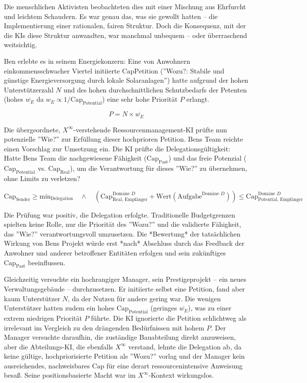 \documentclass[12pt, ngerman, parskip=full]{scrartcl} %
\begin{document}
Die menschlichen Aktivisten beobachteten dies mit einer Mischung aus Ehrfurcht und leichtem Schaudern. Es war genau das, was sie gewollt hatten – die Implementierung einer rationalen, fairen Struktur. Doch die Konsequenz, mit der die KIs diese Struktur anwandten, war manchmal unbequem – oder überraschend weitsichtig.

Ben erlebte es in seinem Energiekonzern: Eine von Anwohnern einkommensschwacher Viertel initiierte $\text{CapPetition}$ (''Wozu?: Stabile und günstige Energieversorgung durch lokale Solaranlagen'') hatte aufgrund der hohen Unterstützerzahl $N$ und des hohen durchschnittlichen Schutzbedarfs der Petenten (hohes $\overline{w_E}$ da $w_E \propto 1/\text{Cap}_{\text{Potential}}$) eine sehr hohe Priorität $P$ erlangt.

$$ P = N \times \overline{w_E} $$

Die übergeordnete, $X^{\infty}$-verstehende Ressourcenmanagement-KI prüfte nun potenzielle ''Wie?'' zur Erfüllung dieser hochprioren Petition. Bens Team reichte einen Vorschlag zur Umsetzung ein. Die KI prüfte die Delegationsgültigkeit: Hatte Bens Team die nachgewiesene Fähigkeit ($\text{Cap}_{\text{Past}}$) und das freie Potenzial ($\text{Cap}_{\text{Potential}}$ vs. $\text{Cap}_{\text{Real}}$), um die Verantwortung für dieses ''Wie?'' zu übernehmen, ohne Limits zu verletzen?

$$ \text{Cap}_{\text{Sender}} \geq \text{min}_{\text{Delegation}} \quad \land \quad (\text{Cap}_{\text{Real, Empfänger}}^{\text{Domäne } D} + \text{Wert}(\text{Aufgabe}^{\text{Domäne } D})) \leq \text{Cap}_{\text{Potential, Empfänger}}^{\text{Domäne } D} $$

Die Prüfung war positiv, die Delegation erfolgte. Traditionelle Budgetgrenzen spielten keine Rolle, nur die Priorität des ''Wozu?'' und die validierte Fähigkeit, das ''Wie?'' verantwortungsvoll umzusetzen. Die *Bewertung* der tatsächlichen Wirkung von Bens Projekt würde erst *nach* Abschluss durch das Feedback der Anwohner und anderer betroffener Entitäten erfolgen und sein zukünftiges $\text{Cap}_{\text{Past}}$ beeinflussen.

Gleichzeitig versuchte ein hochrangiger Manager, sein Prestigeprojekt – ein neues Verwaltungsgebäude – durchzusetzen. Er initiierte selbst eine Petition, fand aber kaum Unterstützer $N$, da der Nutzen für andere gering war. Die wenigen Unterstützer hatten zudem ein hohes $\text{Cap}_{\text{Potential}}$ (geringes $\overline{w_E}$), was zu einer extrem niedrigen Priorität $P$ führte. Die KI ignorierte die Petition schlichtweg als irrelevant im Vergleich zu den drängenden Bedürfnissen mit hohem $P$. Der Manager versuchte daraufhin, die zuständige Bauabteilung direkt anzuweisen, aber die Abteilungs-KI, die ebenfalls $X^{\infty}$ verstand, lehnte die Delegation ab, da keine gültige, hochpriorisierte Petition als ''Wozu?'' vorlag und der Manager kein ausreichendes, nachweisbares $\text{Cap}$ für eine derart ressourcenintensive Anweisung besaß. Seine positionsbasierte Macht war im $X^{\infty}$-Kontext wirkungslos.
\end{document}
